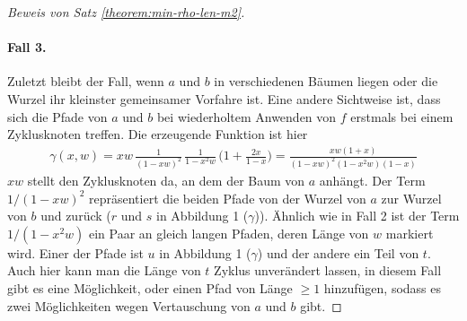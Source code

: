 \documentclass[a4paper, 10pt, ngerman]{article}
\begin{document}
\begin{proof}[Beweis von Satz \ref{theorem:min-rho-len-m2}]
        \paragraph{Fall 3.} Zuletzt bleibt der Fall, wenn $a$ und $b$ in verschiedenen Bäumen liegen oder die Wurzel ihr kleinster gemeinsamer Vorfahre ist. Eine andere Sichtweise ist, dass sich die Pfade von $a$ und $b$ bei wiederholtem Anwenden von $f$ erstmals bei einem Zyklusknoten treffen. Die erzeugende Funktion ist hier
        \begin{align*}
            \gamma(x, w)
            = xw \, \frac {1} {(1 - xw)^2} \, \frac {1} {1 - x^2w} \,
            \Bigg (1 + \frac {2x}{1 - x} \Bigg )
            = \frac {xw(1 + x)} {(1 - xw)^2(1 - x^2w)(1 - x)}
        \end{align*}
        $xw$ stellt den Zyklusknoten da, an dem der Baum von $a$ anhängt. Der Term $1/(1 - xw)^2$ repräsentiert die beiden Pfade von der Wurzel von $a$ zur Wurzel von $b$ und zurück ($r$ und $s$ in Abbildung 1 ($\gamma$)). Ähnlich wie in Fall 2 ist der Term $1/(1 - x^2w)$ ein Paar an gleich langen Pfaden, deren Länge von $w$ markiert wird. Einer der Pfade ist $u$ in Abbildung 1 ($\gamma$) und der andere ein Teil von $t$. Auch hier kann man die Länge von $t$ Zyklus unverändert lassen, in diesem Fall gibt es eine Möglichkeit, oder einen Pfad von Länge $\ge 1$ hinzufügen, sodass es zwei Möglichkeiten wegen Vertauschung von $a$ und $b$ gibt.


\end{proof}
\end{document}
